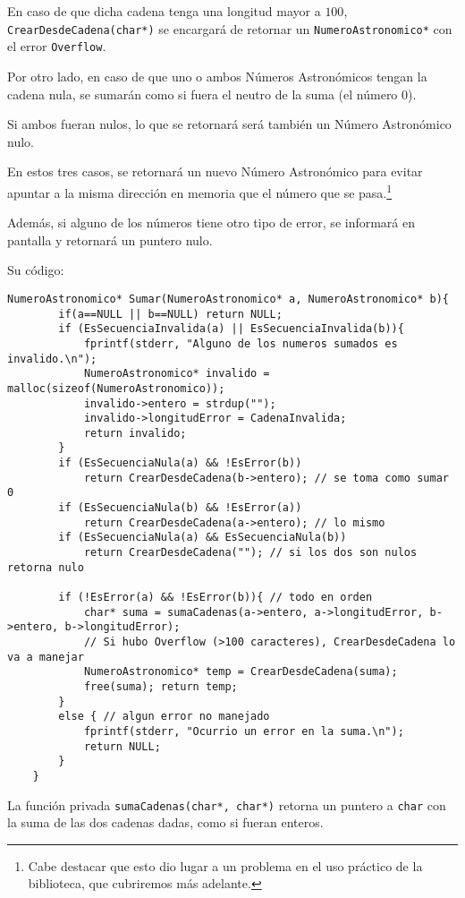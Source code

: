 \documentclass[a4paper, 12pt]{article}
\begin{document}
En caso de que dicha cadena tenga una longitud mayor a $100$, \verb|CrearDesdeCadena(char*)| se encargará de retornar un \verb|NumeroAstronomico*| con el error \verb|Overflow|.

Por otro lado, en caso de que uno o ambos Números Astronómicos tengan la cadena nula, se sumarán como si fuera el neutro de la suma (el número $0$).

Si ambos fueran nulos, lo que se retornará será también un Número Astronómico nulo.

En estos tres casos, se retornará un nuevo Número Astronómico para evitar apuntar a la misma dirección en memoria que el número que se pasa.\footnote{Cabe destacar que esto dio lugar a un problema en el uso práctico de la biblioteca, que cubriremos más adelante.}

Además, si alguno de los números tiene otro tipo de error, se informará en pantalla y retornará un puntero nulo.

Su código:

\begin{lstlisting}[style=C]
    NumeroAstronomico* Sumar(NumeroAstronomico* a, NumeroAstronomico* b){
        if(a==NULL || b==NULL) return NULL;
        if (EsSecuenciaInvalida(a) || EsSecuenciaInvalida(b)){
            fprintf(stderr, "Alguno de los numeros sumados es invalido.\n");
            NumeroAstronomico* invalido = malloc(sizeof(NumeroAstronomico));
            invalido->entero = strdup("");
            invalido->longitudError = CadenaInvalida;
            return invalido;
        }
        if (EsSecuenciaNula(a) && !EsError(b))
            return CrearDesdeCadena(b->entero); // se toma como sumar 0
        if (EsSecuenciaNula(b) && !EsError(a))
            return CrearDesdeCadena(a->entero); // lo mismo
        if (EsSecuenciaNula(a) && EsSecuenciaNula(b))
            return CrearDesdeCadena(""); // si los dos son nulos retorna nulo
    
        if (!EsError(a) && !EsError(b)){ // todo en orden
            char* suma = sumaCadenas(a->entero, a->longitudError, b->entero, b->longitudError);
            // Si hubo Overflow (>100 caracteres), CrearDesdeCadena lo va a manejar
            NumeroAstronomico* temp = CrearDesdeCadena(suma);
            free(suma); return temp;
        }
        else { // algun error no manejado
            fprintf(stderr, "Ocurrio un error en la suma.\n");
            return NULL;
        }
    }
\end{lstlisting}

La función privada \verb|sumaCadenas(char*, char*)| retorna un puntero a \verb|char| con la suma de las dos cadenas dadas, como si fueran enteros.
\end{document}
